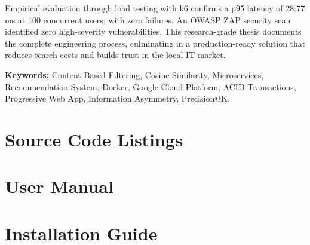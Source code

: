 \documentclass[12pt,a4paper,oneside]{report}
\begin{document}
Empirical evaluation through load testing with k6 confirms a p95 latency of
28.77 ms at 100 concurrent users, with zero failures. An OWASP ZAP security scan
identified zero high-severity vulnerabilities. This research-grade thesis
documents the complete engineering process, culminating in a production-ready
solution that reduces search costs and builds trust in the local IT market.

\vspace{1cm}
\noindent\textbf{Keywords:} Content-Based Filtering, Cosine Similarity,
Microservices, Recommendation System, Docker, Google Cloud Platform, ACID
Transactions, Progressive Web App, Information Asymmetry, Precision@K.

\tableofcontents
\listoffigures
\listoftables

\clearpage
{}











\appendix
\chapter{Source Code Listings}
\chapter{User Manual}
\chapter{Installation Guide}
\end{document}
